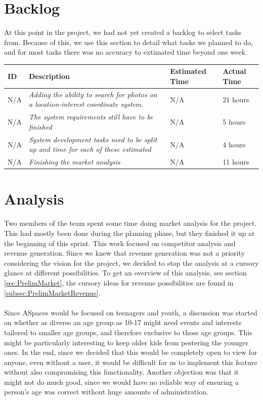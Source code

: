 \section{Backlog}
\label{sec:S1Backlog}
At this point in the project, we had not yet created a backlog to select tasks from. Because of this, we use this section to detail what tasks we planned to do, and for most tasks there was no accuracy to extimated time beyond one week. \\
\begin{minipage}{\linewidth}
\setlength{\tabcolsep}{12pt}
\centering
{}
\begin{tabular}{|p{1cm}|p{4cm}|p{2cm}|p{2cm}|}
\hline
\cellcolor{gray!25} ID & \cellcolor{gray!25} Description & \cellcolor{gray!25} Estimated Time & \cellcolor{gray!25} Actual Time \\
\hline
N/A & \it{Adding the ability to search for photos on a location-interest coordinate system.} & N/A & 21 hours \\
N/A & \it{The system requirements still have to be finished} & N/A & 5 hours \\
N/A & \it{System development tasks need to be split up and time for each of these estimated} & N/A & 4 hours \\
N/A & \it{Finishing the market analysis} & N/A & 11 hours \\
\hline
\end{tabular}
\end{minipage}

\section{Analysis}
\label{sec:S1Analysis}
Two members of the team spent some time doing market analysis for the project. This had mostly been done during the planning phase, but they finished it up at the beginning of this sprint. This work focused on competitor analysis and revenue generation. Since we knew that revenue generation was not a priority considering the vision for the project, we decided to stop the analysis at a cursory glance at different possibilities. To get an overview of this analysis, see section \ref{sec:PrelimMarket}, the cursory ideas for revenue possibilities are found in \ref{subsec:PrelimMarketRevenue}.

\paragraph{} Since ASpaces would be focused on teenagers and youth, a discussion was started on whether as diverse an age group as 10-17 might need events and interests tailored to smaller age groups, and therefore exclusive to those age groups. This might be particularly interesting to keep older kids from pestering the younger ones. In the end, since we decided that this would be completely open to view for anyone, even without a user, it would be difficult for us to implement this feature without also compromising this functionality. Another objection was that it might not do much good, since we would have no reliable way of ensuring a person's age was correct without huge amounts of administration.


